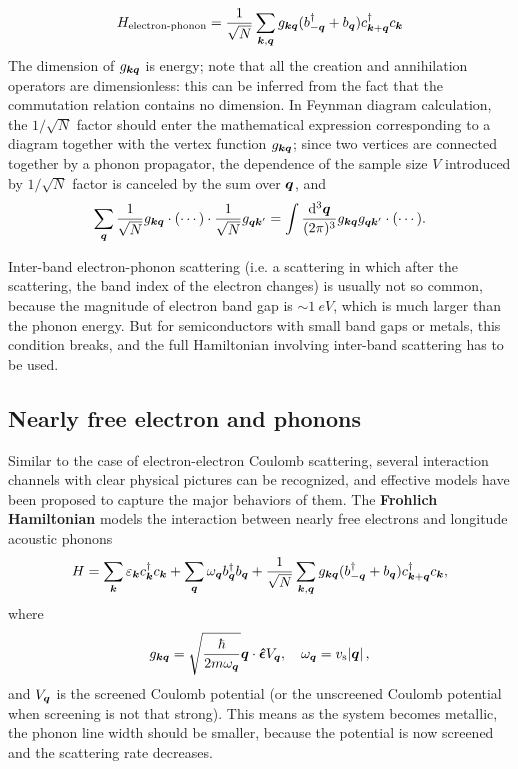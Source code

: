 \documentclass[hyperref, a4paper]{article}
\newcommand*{\concept}[1]{{\textbf{#1}}}
\begin{document}
\begin{equation}
    H_{\text{electron-phonon}} = \frac{1}{\sqrt{N}} \sum_{\vb*{k}, \vb*{q}}
    g_{\vb*{k} \vb*{q}} (b^\dagger_{- \vb*{q}} + b_{\vb*{q}}) c^\dagger_{\vb*{k} + \vb*{q}} c_{\vb*{k}}
\end{equation}
The dimension of $g_{\vb*{k} \vb*{q}}$ is energy; 
note that all the creation and annihilation operators
are dimensionless: 
this can be inferred from the fact that the commutation relation contains no dimension.
In Feynman diagram calculation, 
the $1 / \sqrt{N}$ factor should enter 
the mathematical expression corresponding to a diagram 
together with the vertex function $g_{\vb*{k} \vb*{q}}$;
since two vertices are connected together by a phonon propagator, 
the dependence of the sample size $V$
introduced by $1 / \sqrt{N}$ factor is canceled by 
the sum over $\vb*{q}$, 
and 
\[
    \sum_{\vb*{q}} \frac{1}{\sqrt{N}} g_{\vb*{k} \vb*{q}} \cdot (\cdots) \cdot \frac{1}{\sqrt{N}} g_{\vb*{q} \vb*{k}'} = \int \frac{\dd[3]{\vb*{q}}}{(2\pi)^3} g_{\vb*{k} \vb*{q}} g_{\vb*{q} \vb*{k}'} \cdot (\cdots).
\]

Inter-band electron-phonon scattering 
(i.e. a scattering in which after the scattering, 
the band index of the electron changes)
is usually not so common, 
because the magnitude of electron band gap is $\sim \SI{1}{eV}$,
which is much larger than the phonon energy.
But for semiconductors with small band gaps or metals, 
this condition breaks, 
and the full Hamiltonian involving inter-band scattering has to be used. 

\subsection{Nearly free electron and phonons}

Similar to the case of electron-electron Coulomb scattering, 
several interaction channels with clear physical pictures can be recognized,
and effective models have been proposed to capture the major behaviors of them.
The \concept{Frohlich Hamiltonian} models 
the interaction between nearly free electrons 
and longitude acoustic phonons
\begin{equation}
    H = \sum_{\vb*{k}} \varepsilon_{\vb*{k}} c^\dagger_{\vb*{k}} c_{\vb*{k}}
    + \sum_{\vb*{q}} \omega_{\vb*{q}} b^\dagger_{\vb*{q}} b_{\vb*{q}}
    + \frac{1}{\sqrt{N}} \sum_{\vb*{k}, \vb*{q}} 
    g_{\vb*{k} \vb*{q}} (b_{- \vb*{q}}^\dagger + b_{\vb*{q}}) c^\dagger_{\vb*{k} + \vb*{q}} c_{\vb*{k}},
\end{equation}
where 
\begin{equation} 
    g_{\vb*{k} \vb*{q}} = \sqrt{\frac{\hbar}{2 m \omega_{\vb*{q}}}} \vb*{q} \cdot \vu*{\epsilon} V_{\vb*{q}}, 
    \quad \omega_{\vb*{q}} = v_{\text{s}} \abs*{\vb*{q}}, 
\end{equation}
and $V_{\vb*{q}}$ is the screened Coulomb potential
(or the unscreened Coulomb potential 
when screening is not that strong).
This means as the system becomes metallic, 
the phonon line width should be smaller, 
because the potential is now screened 
and the scattering rate decreases.
\end{document}
